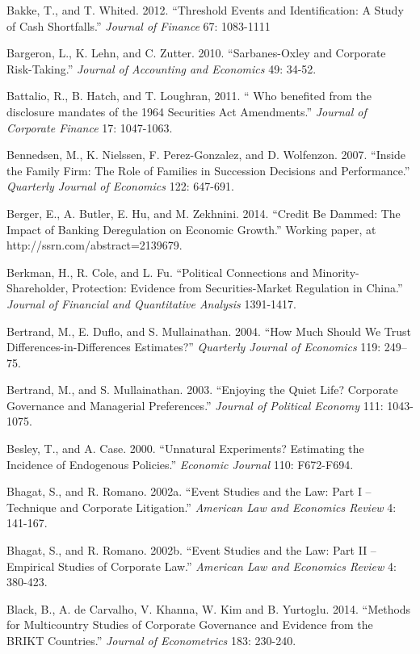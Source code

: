 \noindent Bakke, T., and T. Whited. 2012. ``Threshold Events and Identification:  A Study of Cash Shortfalls.''  \textit{Journal of Finance} 67: 1083-1111

\noindent Bargeron, L., K. Lehn, and C. Zutter. 2010. ``Sarbanes-Oxley and Corporate Risk-Taking.''  \textit{Journal of Accounting and Economics} 49: 34-52.

\noindent Battalio, R., B. Hatch, and T. Loughran, 2011. `` Who benefited from the disclosure mandates of the 1964 Securities Act Amendments.'' \textit{Journal of Corporate Finance} 17: 1047-1063.

\noindent Bennedsen, M., K. Nielssen, F. Perez-Gonzalez, and D. Wolfenzon. 2007. ``Inside the Family Firm: The Role of Families in Succession Decisions and Performance.''  \textit{Quarterly Journal of Economics} 122: 647-691.

\noindent Berger, E., A. Butler, E. Hu, and M. Zekhnini.  2014.  ``Credit Be Dammed: The Impact of Banking Deregulation on Economic Growth.'' Working paper, at http://ssrn.com/abstract=2139679.

\noindent Berkman, H., R. Cole, and L. Fu. ``Political Connections and Minority-Shareholder, Protection: Evidence from Securities-Market Regulation in China.'' \textit{Journal of Financial and Quantitative Analysis} 1391-1417.

\noindent Bertrand, M., E. Duflo, and S. Mullainathan. 2004. ``How Much Should We Trust Differences-in-Differences Estimates?''  \textit{Quarterly Journal of Economics} 119: 249--75.

\noindent Bertrand, M., and S. Mullainathan. 2003. ``Enjoying the Quiet Life?  Corporate Governance and Managerial Preferences.''  \textit{Journal of Political Economy }111: 1043-1075.

\noindent Besley, T., and A. Case. 2000. ``Unnatural Experiments?  Estimating the Incidence of Endogenous Policies.''  \textit{Economic Journal} 110: F672-F694.

\noindent Bhagat, S., and R. Romano. 2002a. ``Event Studies and the Law: Part I -- Technique and Corporate Litigation.'' \textit{American Law and Economics Review} 4: 141-167.

\noindent Bhagat, S., and R. Romano. 2002b. ``Event Studies and the Law: Part II -- Empirical Studies of Corporate Law.''  \textit{American Law and Economics Review} 4: 380-423.

\noindent Black, B., A. de Carvalho, V. Khanna, W. Kim and B. Yurtoglu. 2014. ``Methods for Multicountry Studies of Corporate Governance and Evidence from the BRIKT Countries.'' \textit{Journal of Econometrics} 183: 230-240.

